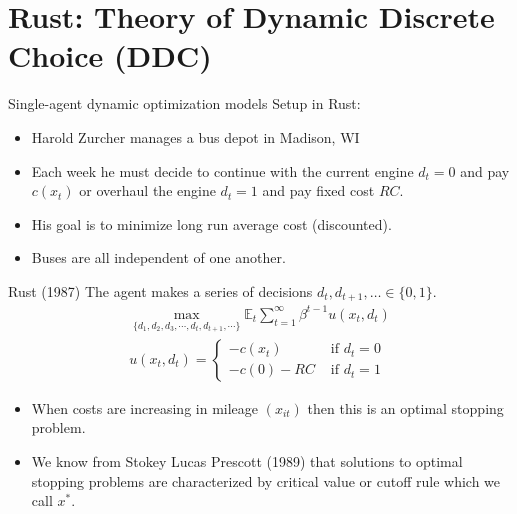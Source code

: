 \documentclass[aspectratio=169,11pt]{beamer}
\begin{document}
\section{Rust: Theory of Dynamic Discrete Choice (DDC)}

\begin{frame}{Single-agent dynamic optimization models}
Setup in Rust:
\begin{itemize}
\item Harold Zurcher manages a bus depot in Madison, WI
\item Each week he must decide to continue with the current engine $d_t=0$ and pay $c(x_{t})$ or overhaul the engine $d_t=1$ and pay fixed cost $RC$.
\item His goal is to minimize \alert{long run average cost} (discounted).
\item Buses are all  \alert{independent} of one another.
\end{itemize}
\end{frame}




\begin{frame}{Rust (1987)}
The agent makes a series of decisions $d_t,d_{t+1},\ldots \in \{0,1\}$.
\begin{eqnarray*}
\max_{\{d_1, d_2, d_3, \cdots, d_t, d_{t+1}, \cdots \}} \mathbb{E}_t \sum^{\infty}_{t=1} \beta^{t-1} u (x_t,d_t)\\
u \left(x_{t},d_{t} \right)=
		\begin{cases}
		-c\left(x_{t} \right)  & \mbox{ if }d_{t}=0\\
		 -c\left(0\right) -RC& \mbox{ if }d_{t}=1
		\end{cases}
\end{eqnarray*}
\begin{itemize}
\item When costs are increasing in mileage $(x_{it})$ then this is an \alert{optimal stopping problem}.
\item We know from Stokey Lucas Prescott (1989) that solutions to optimal stopping problems are characterized by \alert{critical value} or \alert{cutoff rule} which we call $x^*$.
\end{itemize}
\end{frame}
\end{document}
